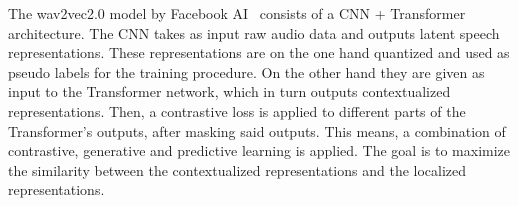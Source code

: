 The wav2vec2.0 model by Facebook AI~\cite{wav2vec20} consists of a CNN + Transformer architecture. The CNN takes as input raw audio data and outputs latent speech representations. These representations are on the one hand quantized and used as pseudo labels for the training procedure. On the other hand they are given as input to the Transformer network, which in turn outputs contextualized representations. Then, a contrastive loss is applied to different parts of the Transformer's outputs, after masking said outputs. This means, a combination of contrastive, generative and predictive learning is applied. The goal is to maximize the similarity between the contextualized representations and the localized representations.